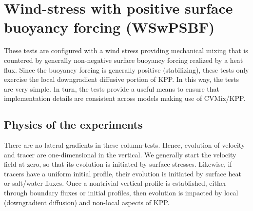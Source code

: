 \chapter{Wind-stress with positive surface buoyancy forcing
   (WSwPSBF)}
\label{chapter:WSwPSBF}

 These tests are configured with a wind stress providing mechanical
 mixing that is countered by generally non-negative surface buoyancy
 forcing realized by a heat flux.  Since the buoyancy forcing is
 generally positive (stabilizing), these tests only exercise the local
 downgradient diffusive portion of KPP.  In this way, the tests are
 very simple.  In turn, the tests provide a useful means to ensure
 that implementation details are consistent across models making use
 of CVMix/KPP.


\section{Physics of the experiments}

There are no lateral gradients in these column-tests.  Hence,
evolution of velocity and tracer are one-dimensional in the vertical.
We generally start the velocity field at zero, so that its evolution
is initiated by surface stresses.  Likewise, if tracers have a uniform
initial profile, their evolution is initiated by surface heat or
salt/water fluxes.  Once a nontrivial vertical profile is established,
either through boundary fluxes or initial profiles, then evolution is
impacted by local (downgradient diffusion) and non-local aspects of
KPP.

